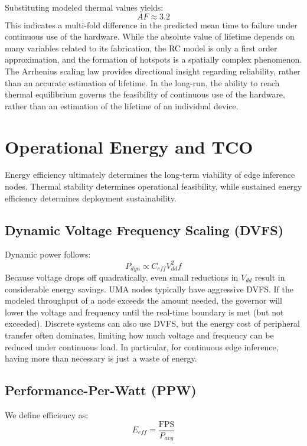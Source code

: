 \documentclass[conference]{IEEEtran}
\begin{document}
Substituting modeled thermal values yields:
\begin{equation}
AF \approx 3.2
\end{equation}
This indicates a multi-fold difference in the predicted mean time to failure under continuous use of the hardware. While the absolute value of lifetime depends on many variables related to its fabrication, the RC model is only a first order approximation, and the formation of hotspots is a spatially complex phenomenon. The Arrhenius scaling law provides directional insight regarding reliability, rather than an accurate estimation of lifetime. In the long-run, the ability to reach thermal equilibrium governs the feasibility of continuous use of the hardware, rather than an estimation of the lifetime of an individual device.

\section{Operational Energy and TCO}

Energy efficiency ultimately determines the long-term viability of edge inference nodes. Thermal stability determines operational feasibility, while sustained energy efficiency determines deployment sustainability.

\subsection{Dynamic Voltage Frequency Scaling (DVFS)}
Dynamic power follows:
\begin{equation}
P_{dyn} \propto C_{eff} V_{dd}^2 f
\end{equation}
Because voltage drops off quadratically, even small reductions in $V_{dd}$ result in considerable energy savings. UMA nodes typically have aggressive DVFS. If the modeled throughput of a node exceeds the amount needed, the governor will lower the voltage and frequency until the real-time boundary is met (but not exceeded). Discrete systems can also use DVFS, but the energy cost of peripheral transfer often dominates, limiting how much voltage and frequency can be reduced under continuous load. In particular, for continuous edge inference, having more than necessary is just a waste of energy.

\subsection{Performance-Per-Watt (PPW)}
We define efficiency as:
\begin{equation}
E_{eff} = \frac{\text{FPS}}{P_{avg}}
\end{equation}
\end{document}

